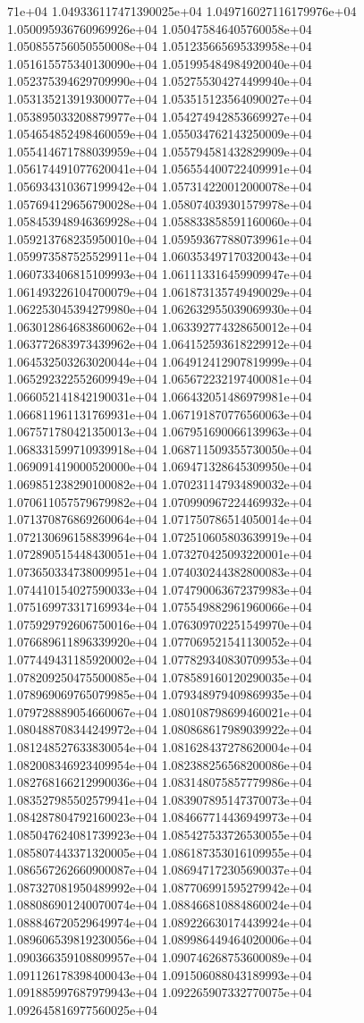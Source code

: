 71e+04	1.049336117471390025e+04	1.049716027116179976e+04	1.050095936760969926e+04	1.050475846405760058e+04	1.050855756050550008e+04	1.051235665695339958e+04	1.051615575340130090e+04	1.051995484984920040e+04	1.052375394629709990e+04	1.052755304274499940e+04	1.053135213919300077e+04	1.053515123564090027e+04	1.053895033208879977e+04	1.054274942853669927e+04	1.054654852498460059e+04	1.055034762143250009e+04	1.055414671788039959e+04	1.055794581432829909e+04	1.056174491077620041e+04	1.056554400722409991e+04	1.056934310367199942e+04	1.057314220012000078e+04	1.057694129656790028e+04	1.058074039301579978e+04	1.058453948946369928e+04	1.058833858591160060e+04	1.059213768235950010e+04	1.059593677880739961e+04	1.059973587525529911e+04	1.060353497170320043e+04	1.060733406815109993e+04	1.061113316459909947e+04	1.061493226104700079e+04	1.061873135749490029e+04	1.062253045394279980e+04	1.062632955039069930e+04	1.063012864683860062e+04	1.063392774328650012e+04	1.063772683973439962e+04	1.064152593618229912e+04	1.064532503263020044e+04	1.064912412907819999e+04	1.065292322552609949e+04	1.065672232197400081e+04	1.066052141842190031e+04	1.066432051486979981e+04	1.066811961131769931e+04	1.067191870776560063e+04	1.067571780421350013e+04	1.067951690066139963e+04	1.068331599710939918e+04	1.068711509355730050e+04	1.069091419000520000e+04	1.069471328645309950e+04	1.069851238290100082e+04	1.070231147934890032e+04	1.070611057579679982e+04	1.070990967224469932e+04	1.071370876869260064e+04	1.071750786514050014e+04	1.072130696158839964e+04	1.072510605803639919e+04	1.072890515448430051e+04	1.073270425093220001e+04	1.073650334738009951e+04	1.074030244382800083e+04	1.074410154027590033e+04	1.074790063672379983e+04	1.075169973317169934e+04	1.075549882961960066e+04	1.075929792606750016e+04	1.076309702251549970e+04	1.076689611896339920e+04	1.077069521541130052e+04	1.077449431185920002e+04	1.077829340830709953e+04	1.078209250475500085e+04	1.078589160120290035e+04	1.078969069765079985e+04	1.079348979409869935e+04	1.079728889054660067e+04	1.080108798699460021e+04	1.080488708344249972e+04	1.080868617989039922e+04	1.081248527633830054e+04	1.081628437278620004e+04	1.082008346923409954e+04	1.082388256568200086e+04	1.082768166212990036e+04	1.083148075857779986e+04	1.083527985502579941e+04	1.083907895147370073e+04	1.084287804792160023e+04	1.084667714436949973e+04	1.085047624081739923e+04	1.085427533726530055e+04	1.085807443371320005e+04	1.086187353016109955e+04	1.086567262660900087e+04	1.086947172305690037e+04	1.087327081950489992e+04	1.087706991595279942e+04	1.088086901240070074e+04	1.088466810884860024e+04	1.088846720529649974e+04	1.089226630174439924e+04	1.089606539819230056e+04	1.089986449464020006e+04	1.090366359108809957e+04	1.090746268753600089e+04	1.091126178398400043e+04	1.091506088043189993e+04	1.091885997687979943e+04	1.092265907332770075e+04	1.092645816977560025e+04
